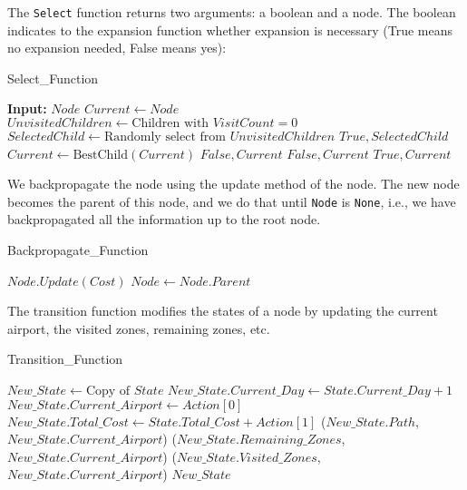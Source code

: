 The \texttt{Select} function returns two arguments: a boolean and a node. The boolean indicates to the expansion function whether expansion is necessary (True means no expansion needed, False means yes):

\begin{algorithm}[H]
    \caption{Select\_Function}
    \label{alg:SelectFunction}
    \begin{algorithmic}[1]
        \STATE \textbf{Input:} $Node$
        \STATE $Current \leftarrow Node$
        \STATE $UnvisitedChildren \leftarrow \text{Children with } VisitCount = 0$
        \STATE $SelectedChild \leftarrow \text{Randomly select from } UnvisitedChildren$
        \RETURN $True, SelectedChild$
        \ENDIF
        \ELSE
        \STATE $Current \leftarrow \text{BestChild}(Current)$
        \ENDIF
        \ENDWHILE
        \RETURN $False, Current$
        \RETURN $False, Current$
        \RETURN $True, Current$
        \ENDIF
    \end{algorithmic}
\end{algorithm}

We backpropagate the node using the update method of the node. The new node becomes the parent of this node, and we do that until \texttt{Node} is \texttt{None}, i.e., we have backpropagated all the information up to the root node.

\begin{algorithm}[H]
    \caption{Backpropagate\_Function}
    \label{alg:Backpropagate}
    \begin{algorithmic}[1]
        \STATE $Node.Update(Cost)$
        \STATE $Node \leftarrow Node.Parent$
        \ENDWHILE
    \end{algorithmic}
\end{algorithm}

The transition function modifies the states of a node by updating the current airport, the visited zones, remaining zones, etc.

\begin{algorithm}[H]
    \caption{Transition\_Function}
    \label{alg:TransitionFunction}
    \begin{algorithmic}[1]
        \STATE $New\_State \leftarrow \text{Copy of } State$
        \STATE $New\_State.Current\_Day \leftarrow State.Current\_Day + 1$
        \STATE $New\_State.Current\_Airport \leftarrow Action[0]$
        \STATE $New\_State.Total\_Cost \leftarrow State.Total\_Cost + Action[1]$
        \STATE {}($New\_State.Path$, $New\_State.Current\_Airport$)
        \STATE {}($New\_State.Remaining\_Zones$, $New\_State.Current\_Airport$)
        \STATE {}($New\_State.Visited\_Zones$, $New\_State.Current\_Airport$)
        \RETURN $New\_State$
    \end{algorithmic}
\end{algorithm}

